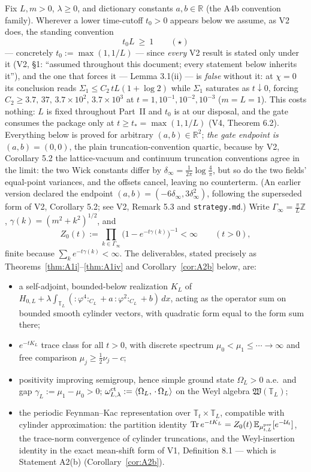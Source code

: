 \documentclass[11pt,a4paper]{article}
\theoremstyle{plain}
\theoremstyle{definition}
\newcommand{\R}{\mathbb{R}}
\newcommand{\Z}{\mathbb{Z}}
\newcommand{\T}{\mathbb{T}}
\newcommand{\E}{\mathbb{E}}
\newcommand{\U}{\mathcal U}
\newcommand{\ip}[2]{\langle #1,#2\rangle}
\newcommand{\Trace}{\mathrm{Tr}}
\begin{document}
Fix $L,m>0$, $\lambda\ge0$, and dictionary constants $a,b\in\R$ (the A4b
convention family). Wherever a lower time-cutoff $t_0>0$ appears below we assume, as
V2 does, the standing convention
\[
 t_0L\ \ge\ 1 \qquad(\star)
\]
--- concretely $t_0:=\max(1,1/L)$ --- since \emph{every} V2 result is stated only under it (V2, \S1: ``assumed throughout
this document; every statement below inherits it''), and the one that forces it ---
Lemma 3.1(ii) --- is \emph{false} without it: at $\chi=0$ its conclusion reads $\Sigma_1\le C_2\,tL(1+\log2)$ while $\Sigma_1$
saturates as $t\downarrow0$, forcing $C_2\ge3.7,\,37,\,3.7\times10^2,\,3.7\times10^3$ at
$t=1,10^{-1},10^{-2},10^{-3}$ ($m=L=1$). This costs nothing: $L$ is fixed throughout
Part~II and $t_0$ is at our disposal, and the gate consumes the package only at
$t\ge t_*=\max(1,1/L)$ (V4, Theorem 6.2). Everything below is proved for arbitrary $(a,b)\in\R^2$;
\emph{the gate endpoint is $(a,b)=(0,0)$}, the plain truncation-convention
quartic, because by V2, Corollary 5.2 the lattice-vacuum and continuum
truncation conventions agree in the limit: the two Wick constants differ by
$\delta_\infty=\tfrac1{2\pi}\log\tfrac4\pi$, but so do the two fields'
equal-point variances, and the offsets cancel, leaving no counterterm. (An
earlier version declared the endpoint
$(a,b)=(-6\delta_\infty,3\delta_\infty^2)$, following the superseded form of
V2, Corollary 5.2; see V2, Remark 5.3 and \texttt{strategy.md}.) Write $\Gamma_\infty=
\tfrac\pi L\Z$, $\gamma(k)=(m^2+k^2)^{1/2}$, and
\[
 Z_0(t):=\prod_{k\in\Gamma_\infty}\bigl(1-e^{-t\gamma(k)}\bigr)^{-1}<\infty
 \qquad(t>0),
\]
finite because $\sum_ke^{-t\gamma(k)}<\infty$. The deliverables, stated
precisely as Theorems~\ref{thm:A1i}--\ref{thm:A1iv} and
Corollary~\ref{cor:A2b} below, are:

\begin{itemize}
\item[(A1-i)] a self-adjoint, bounded-below realization $K_L$ of
$H_{0,L}+\lambda\int_{\T_L}({:}\varphi^4{:}_{C_L}+a\,{:}\varphi^2{:}_{C_L}
+b)\,dx$, acting as the operator sum on bounded smooth cylinder vectors,
with quadratic form equal to the form sum there;
\item[(A1-ii)] $e^{-tK_L}$ trace class for all $t>0$, with discrete spectrum
$\mu_0<\mu_1\le\cdots\to\infty$ and free comparison
$\mu_j\ge\tfrac12\nu_j-c$;
\item[(A1-iii)] positivity improving semigroup, hence simple ground state
$\Omega_L>0$ a.e.\ and gap $\gamma_L:=\mu_1-\mu_0>0$;
$\omega^{\rm ct}_{L,\lambda}:=\ip{\Omega_L}{\,\cdot\,\Omega_L}$ on the Weyl
algebra $\mathfrak W(\T_L)$;
\item[(A1-iv)] the periodic Feynman--Kac representation over
$\T_t\times\T_L$, compatible with cylinder approximation: the partition
identity $\Trace\,e^{-tK_L}=Z_0(t)\,\E_{\mu^{\rm per}_{t,L}}[e^{-\U_t}]$,
the trace-norm convergence of cylinder truncations, and the Weyl-insertion
identity in the exact mean-shift form of V1, Definition 8.1 --- which is
Statement A2(b) (Corollary~\ref{cor:A2b}).
\end{itemize}
\end{document}
